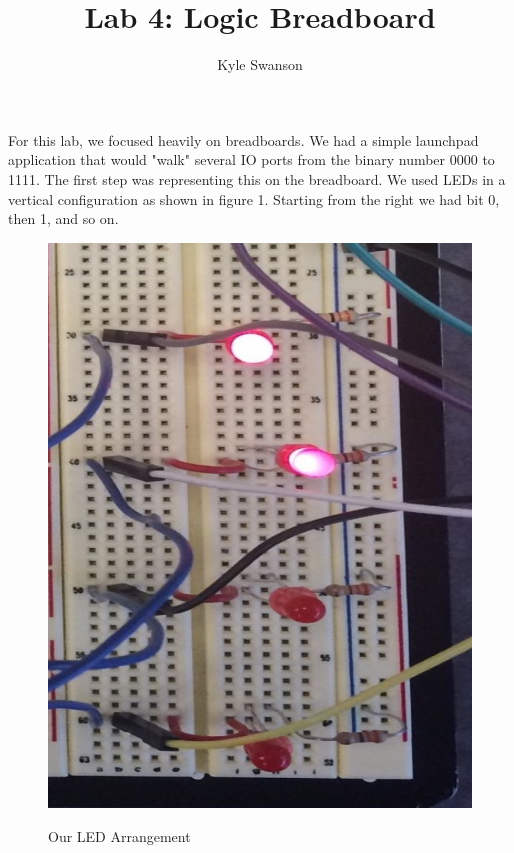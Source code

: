 \documentclass[12pt,a4paper]{report}
\author{Kyle Swanson}
\title{Lab 4: Logic Breadboard}
\begin{document}
\maketitle

\paragraph{}
For this lab, we focused heavily on breadboards. We had a simple launchpad application that would "walk" several IO ports from the binary number 0000 to 1111. The first step was representing this on the breadboard. We used LEDs in a vertical configuration as shown in figure 1. Starting from the right we had bit 0, then 1, and so on. \\
\begin{figure}
	\centering
	\includegraphics[scale=.1]{img/led_config} \\
	\caption{Our LED Arrangement}
\end{figure}
\end{document}
